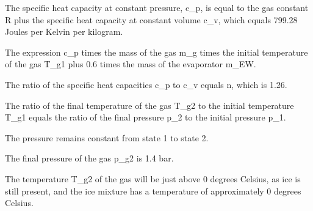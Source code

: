 The specific heat capacity at constant pressure, c_p, is equal to the gas constant R plus the specific heat capacity at constant volume c_v, which equals 799.28 Joules per Kelvin per kilogram.

The expression c_p times the mass of the gas m_g times the initial temperature of the gas T_{g1} plus 0.6 times the mass of the evaporator m_{EW}.

The ratio of the specific heat capacities c_p to c_v equals n, which is 1.26.

The ratio of the final temperature of the gas T_{g2} to the initial temperature T_{g1} equals the ratio of the final pressure p_2 to the initial pressure p_1.

The pressure remains constant from state 1 to state 2.

The final pressure of the gas p_{g2} is 1.4 bar.

The temperature T_{g2} of the gas will be just above 0 degrees Celsius, as ice is still present, and the ice mixture has a temperature of approximately 0 degrees Celsius.